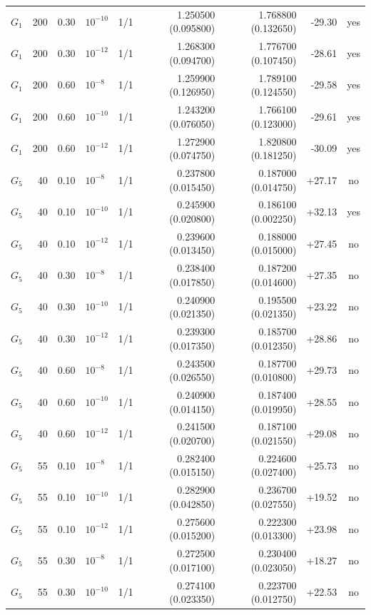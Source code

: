\begin{longtable}{lrrlrrrrc}
$G_1$ & 200 & 0.30 & $10^{-10}$ & 1/1 & 1.250500 (0.095800) & 1.768800 (0.132650) & -29.30 & yes\\
$G_1$ & 200 & 0.30 & $10^{-12}$ & 1/1 & 1.268300 (0.094700) & 1.776700 (0.107450) & -28.61 & yes\\
$G_1$ & 200 & 0.60 & $10^{-8}$ & 1/1 & 1.259900 (0.126950) & 1.789100 (0.124550) & -29.58 & yes\\
$G_1$ & 200 & 0.60 & $10^{-10}$ & 1/1 & 1.243200 (0.076050) & 1.766100 (0.123000) & -29.61 & yes\\
$G_1$ & 200 & 0.60 & $10^{-12}$ & 1/1 & 1.272900 (0.074750) & 1.820800 (0.181250) & -30.09 & yes\\
$G_5$ & 40 & 0.10 & $10^{-8}$ & 1/1 & 0.237800 (0.015450) & 0.187000 (0.014750) & +27.17 & no\\
$G_5$ & 40 & 0.10 & $10^{-10}$ & 1/1 & 0.245900 (0.020800) & 0.186100 (0.002250) & +32.13 & yes\\
$G_5$ & 40 & 0.10 & $10^{-12}$ & 1/1 & 0.239600 (0.013450) & 0.188000 (0.015000) & +27.45 & no\\
$G_5$ & 40 & 0.30 & $10^{-8}$ & 1/1 & 0.238400 (0.017850) & 0.187200 (0.014600) & +27.35 & no\\
$G_5$ & 40 & 0.30 & $10^{-10}$ & 1/1 & 0.240900 (0.021350) & 0.195500 (0.021350) & +23.22 & no\\
$G_5$ & 40 & 0.30 & $10^{-12}$ & 1/1 & 0.239300 (0.017350) & 0.185700 (0.012350) & +28.86 & no\\
$G_5$ & 40 & 0.60 & $10^{-8}$ & 1/1 & 0.243500 (0.026550) & 0.187700 (0.010800) & +29.73 & no\\
$G_5$ & 40 & 0.60 & $10^{-10}$ & 1/1 & 0.240900 (0.014150) & 0.187400 (0.019950) & +28.55 & no\\
$G_5$ & 40 & 0.60 & $10^{-12}$ & 1/1 & 0.241500 (0.020700) & 0.187100 (0.021550) & +29.08 & no\\
$G_5$ & 55 & 0.10 & $10^{-8}$ & 1/1 & 0.282400 (0.015150) & 0.224600 (0.027400) & +25.73 & no\\
$G_5$ & 55 & 0.10 & $10^{-10}$ & 1/1 & 0.282900 (0.042850) & 0.236700 (0.027550) & +19.52 & no\\
$G_5$ & 55 & 0.10 & $10^{-12}$ & 1/1 & 0.275600 (0.015200) & 0.222300 (0.013300) & +23.98 & no\\
$G_5$ & 55 & 0.30 & $10^{-8}$ & 1/1 & 0.272500 (0.017100) & 0.230400 (0.023050) & +18.27 & no\\
$G_5$ & 55 & 0.30 & $10^{-10}$ & 1/1 & 0.274100 (0.023350) & 0.223700 (0.012750) & +22.53 & no\\

\end{longtable}
